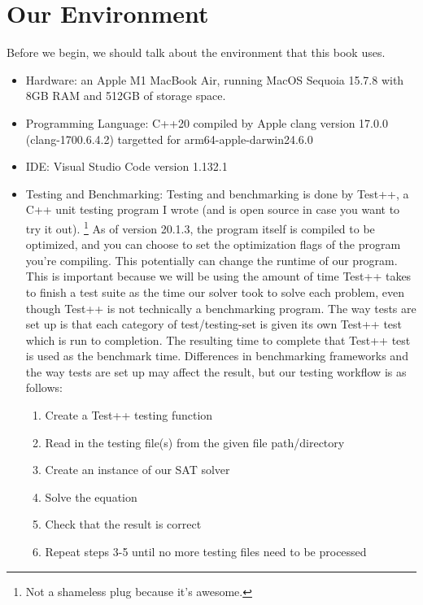 \section{Our Environment}

Before we begin, we should talk about the environment that this book uses. 
\begin{itemize}
    \item Hardware: an Apple M1 MacBook Air, running MacOS Sequoia  15.7.8
            with 8GB RAM and 512GB of storage space.
    \item Programming Language: C++20 compiled by Apple clang version 17.0.0 (clang-1700.6.4.2)
            targetted for arm64-apple-darwin24.6.0
    \item IDE: Visual Studio Code version 1.132.1
    \item Testing and Benchmarking: Testing and benchmarking is done by Test++, a C++ 
            unit testing program I wrote (and is open source in case you want to try it out).
            \footnote{Not a shameless plug because it's awesome.}
            As of version 20.1.3, the program itself is compiled to be optimized, and 
            you can choose to set the optimization flags of the program you're compiling.
            This potentially can change the runtime of our program. This is important because 
            we will be using the amount of time Test++ takes to finish a test suite as the 
            time our solver took to solve each problem, even though Test++ is not technically 
            a benchmarking program. The way tests are set up is that 
            each category of test/testing-set is given its own Test++ test which is run 
            to completion. The resulting time to complete that Test++ test is used as the 
            benchmark time. Differences in benchmarking frameworks and the way tests are set up 
            may affect the result, but our testing workflow is as follows:
        \begin{enumerate}
            \item Create a Test++ testing function
            \item Read in the testing file(s) from the given file path/directory
            \item Create an instance of our SAT solver
            \item Solve the equation
            \item Check that the result is correct
            \item Repeat steps 3-5 until no more testing files need to be processed
        \end{enumerate}
\end{itemize}

